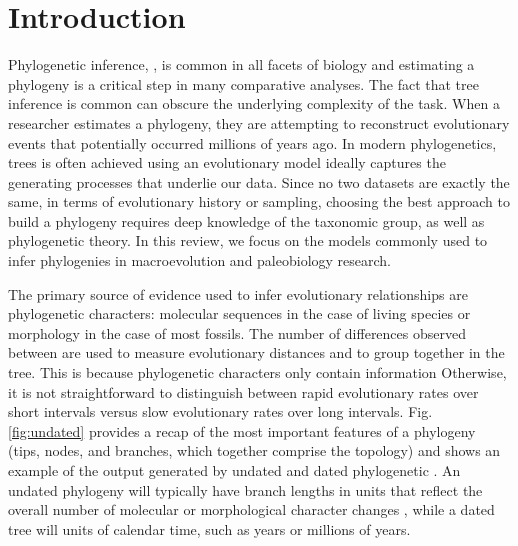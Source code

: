 
\section{Introduction}

Phylogenetic inference, , is common in all facets of biology and estimating a phylogeny is a critical step in many comparative analyses. The fact that tree inference is common can obscure the underlying complexity of the task.
When a researcher estimates a phylogeny, they are attempting to reconstruct evolutionary events that potentially occurred millions of years ago.
In modern phylogenetics,  trees is often achieved  using an evolutionary model  ideally captures the generating processes that underlie our data.
Since no two datasets are exactly the same, in terms of evolutionary history or  sampling, choosing the best approach to build a phylogeny requires deep knowledge of the taxonomic group, as well as phylogenetic theory.
In this review, we focus on the models commonly used to infer phylogenies in macroevolution and paleobiology research.

The primary source of evidence used to infer evolutionary relationships are phylogenetic characters: molecular sequences  in the case of living species or morphology in the case of most fossils.
The number of differences observed between  are used to measure evolutionary distances and to group  together in the tree.
This is because phylogenetic characters only contain information 
Otherwise, it is not straightforward to distinguish between rapid evolutionary rates over short intervals versus slow evolutionary rates over long intervals.
Fig. \ref{fig:undated} provides a recap of the most important features of a phylogeny (tips, nodes, and branches, which together comprise the  topology) and shows an example of the output generated by undated and dated phylogenetic . 
An undated phylogeny will typically have branch lengths in units that reflect the overall number of molecular or morphological character changes , while a dated tree will  units of calendar time, such as years or millions of years.

